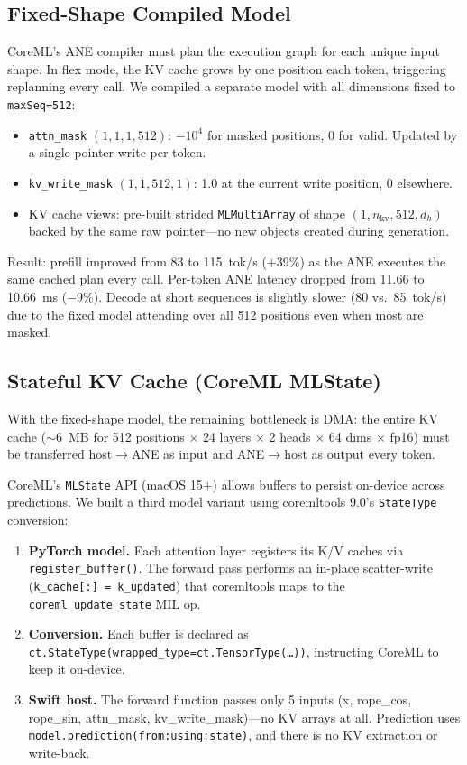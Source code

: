 \documentclass[11pt,twocolumn]{article}
\begin{document}
\subsection{Fixed-Shape Compiled Model}

CoreML's ANE compiler must plan the execution graph for each unique
input shape.  In flex mode, the KV cache grows by one position each
token, triggering replanning every call.  We compiled a separate model
with all dimensions fixed to \texttt{maxSeq=512}:

\begin{itemize}
\item \texttt{attn\_mask} $(1, 1, 1, 512)$: $-10^4$ for masked
  positions, 0 for valid.  Updated by a single pointer write per
  token.
\item \texttt{kv\_write\_mask} $(1, 1, 512, 1)$: 1.0 at the current
  write position, 0 elsewhere.
\item KV cache views: pre-built strided \texttt{MLMultiArray} of shape
  $(1, n_\text{kv}, 512, d_h)$ backed by the same raw pointer---no
  new objects created during generation.
\end{itemize}

Result: prefill improved from 83 to 115~tok/s ($+$39\%) as the ANE
executes the same cached plan every call.  Per-token ANE latency
dropped from 11.66 to 10.66~ms ($-$9\%).  Decode at short sequences is
slightly slower (80 vs.\ 85~tok/s) due to the fixed model attending
over all 512 positions even when most are masked.

\subsection{Stateful KV Cache (CoreML MLState)}

With the fixed-shape model, the remaining bottleneck is DMA: the
entire KV cache ($\sim$6~MB for 512 positions $\times$ 24 layers
$\times$ 2 heads $\times$ 64 dims $\times$ fp16) must be transferred
host$\to$ANE as input and ANE$\to$host as output every token.

CoreML's \texttt{MLState} API (macOS 15+) allows buffers to persist
on-device across predictions.  We built a third model variant using
coremltools 9.0's \texttt{StateType} conversion:

\begin{enumerate}
\item \textbf{PyTorch model.}  Each attention layer registers its K/V
  caches via \texttt{register\_buffer()}.  The forward pass performs an
  in-place scatter-write (\texttt{k\_cache[:] = k\_updated}) that
  coremltools maps to the \texttt{coreml\_update\_state} MIL op.
\item \textbf{Conversion.}  Each buffer is declared as
  \texttt{ct.StateType(wrapped\_type=ct.TensorType(\ldots))},
  instructing CoreML to keep it on-device.
\item \textbf{Swift host.}  The forward function passes only 5 inputs
  (x, rope\_cos, rope\_sin, attn\_mask, kv\_write\_mask)---no KV
  arrays at all.  Prediction uses
  \texttt{model.prediction(from:using:state)}, and there is no KV
  extraction or write-back.
\end{enumerate}
\end{document}
